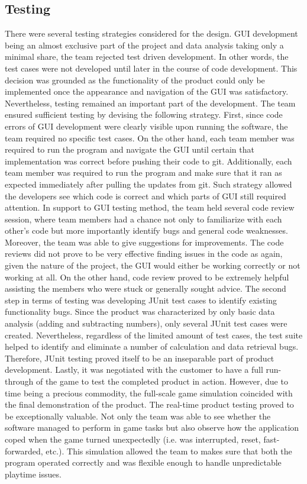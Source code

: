 \documentclass{l3proj}
\begin{document}
\subsection{Testing}
There were several testing strategies considered for the design. GUI development being an almost exclusive part of the project and data analysis taking only a minimal share, the team rejected test driven development. In other words, the test cases were not developed until later in the course of code development. This decision was grounded as the functionality of the product could only be implemented once the appearance and navigation of the GUI was satisfactory. Nevertheless, testing remained an important part of the development.
The team ensured sufficient testing by devising the following strategy. First, since code errors of GUI development were clearly visible upon running the software, the team required no specific test cases. On the other hand, each team member was required to run the program and navigate the GUI until certain that implementation was correct before pushing their code to git. Additionally, each team member was required to run the program and make sure that it ran as expected immediately after pulling the updates from git. Such strategy allowed the developers see which code is correct and which parts of GUI still required attention.
In support to GUI testing method, the team held several code review session, where team members had a chance not only to familiarize with each other’s code but more importantly identify bugs and general code weaknesses. Moreover, the team was able to give suggestions for improvements. The code reviews did not prove to be very effective finding issues in the code as again, given the nature of the project, the GUI would either be working correctly or not working at all. On the other hand, code review proved to be extremely helpful assisting the members who were stuck or generally sought advice.
The second step in terms of testing was developing JUnit test cases to identify existing functionality bugs. Since the product was characterized by only basic data analysis (adding and subtracting numbers), only several JUnit test cases were created. Nevertheless, regardless of the limited amount of test cases, the test suite helped to identify and eliminate a number of calculation and data retrieval bugs. Therefore, JUnit testing proved itself to be an inseparable part of product development.
Lastly, it was negotiated with the customer to have a full run-through of the game to test the completed product in action. However, due to time being a precious commodity, the full-scale game simulation coincided with the final demonstration of the product. The real-time product testing proved to be exceptionally valuable. Not only the team was able to see whether the software managed to perform in game tasks but also observe how the application coped when the game turned unexpectedly (i.e. was interrupted, reset, fast-forwarded, etc.). This simulation allowed the team to makes sure that both the program operated correctly and was flexible enough to handle unpredictable playtime issues.
\end{document}
